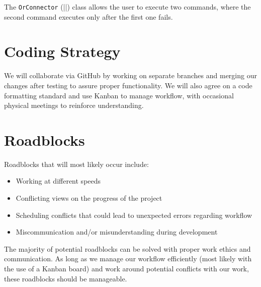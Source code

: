 \documentclass{article}
\begin{document}
The \texttt{OrConnector} (||) class allows the user to execute two commands, where the second command executes only after the first one fails.

\section{Coding Strategy}

We will collaborate via GitHub by working on separate branches and merging our changes after testing to assure proper functionality. We will also agree on a code formatting standard and use Kanban to manage workflow, with occasional physical meetings to reinforce understanding.

\section{Roadblocks}

Roadblocks that will most likely occur include: 

\begin{itemize}
\item Working at different speeds
\item Conflicting views on the progress of the project
\item Scheduling conflicts that could lead to unexpected errors regarding workflow
\item Miscommunication and/or misunderstanding during development
\end{itemize}
The majority of potential roadblocks can be solved with proper work ethics and communication. As long as we manage our workflow efficiently (most likely with the use of a Kanban board) and work around potential conflicts with our work, these roadblocks should be manageable.
\end{document}
